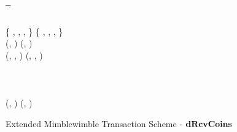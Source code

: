 \begin{landscape}
\begin{figure}
\begin{center}
{{            \pcif \funStarAlt{\varCoinShared} \opNotEq \varCoinShared \opAddPoint \funGen{\varSecKeyCarol} \< \< \< \< \\
            \t \pcreturn \cnstFalsum \< \< \< \< \\
            \varProofBobCarol \opFunResult \procDRProofL{\funStarAlt{\varCoinShared}}{\varFundValue}{\varSecKeyBob} \< \< \< \< \varProofBobCarol \opFunResult \procDRProofL{\funStarAlt{\varCoinShared}}{\varFundValue}{\varSecKeyCarol} \\
            \funStar{\varPtSpendableCoinBob} \opAssign \{ \varCoinShared, \varFundValue, \funStar{\varBlindingFactorBob}, \varProofBobCarol \} \< \< \< \< \funStar{\varPtSpendableCoinCarol} \opAssign \{ \varCoinShared, \varFundValue, \funStar{\varBlindingFactorCarol}, \varProofBobCarol \} \\
            (\varSigBobCarol, \varPubKeyBobCarol) \opFunResult \procDSignL{\varMsg}{\varSecKeyBob}{\varNonceBob} \< \< \< \< (\varSigBobCarol, \varPubKeyBobCarol) \opFunResult \procDSignR{\varMsg}{\varSecKeyCarol}{\varNonceCarol} \\
            (\cdot, \cdot, \funStar{\varSigContext}) \opFunResult \varSigBobCarol \< \< \< \< (\cdot, \cdot, \funStar{\varSigContext}) \opFunResult \varSigBobCarol \\
            \funStarAlt{\varSigContext} \opFunResult {} \< \< \< \< \funStarAlt{\varSigContext} \opFunResult {} \\
            \funStar{\varPreTx} \opFunResult \< \< \< \< \funStar{\varPreTx} \opFunResult \\
            \procCreatePreTx{\varMsg}{\varInputs}{\varOutputs \opConc \funStarAlt{\varCoinShared}}{\varProofs \opConc \varProofBobCarol}{\funStarAlt{\varSigContext}}{\varCommits \opConc \varPubKeyBobCarol}{\varSigBobCarol}{\varTime} \< \< \< \<  \procCreatePreTx{\varMsg}{\varInputs}{\varOutputs \opConc \funStarAlt{\varCoinShared}}{\varProofs \opConc \varProofBobCarol}{\funStarAlt{\varSigContext}}{\varCommits \opConc \varPubKeyBobCarol}{\varSigBobCarol}{\varTime} \\
            \pcreturn (\funStar{\varPreTx}, \funStar{\varPtSpendableCoinBob}) \< \< \< \< \pcreturn (\funStar{\varPreTx}, \funStar{\varPtSpendableCoinCarol})
            }
            }
        \end{center}
        \caption{Extended Mimblewimble Transaction Scheme - $\mathbf{dRcvCoins}$ \label{fig:atom:drecv}}
    \end{figure}
\end{landscape}
\restoregeometry

